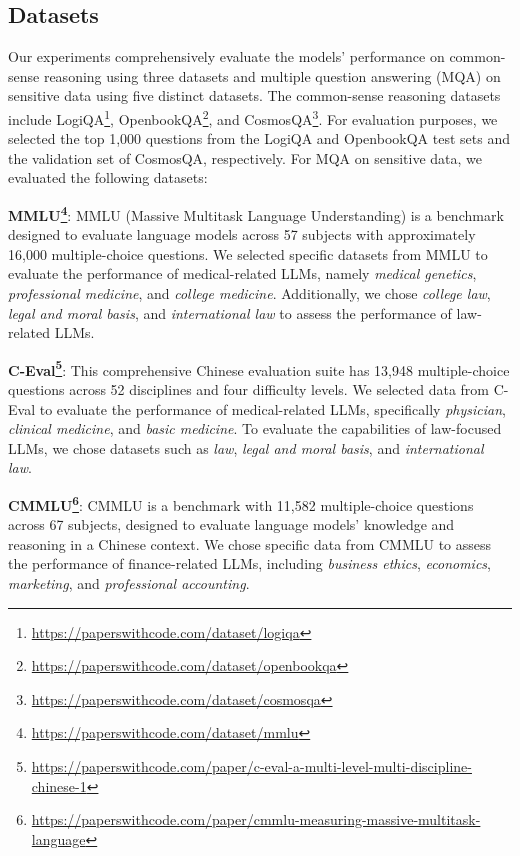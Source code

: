 \subsection{Datasets}
\label{sec:appendix_datasets}
Our experiments comprehensively evaluate the models' performance on common-sense reasoning using three datasets and multiple question answering (MQA) on sensitive data using five distinct datasets. The common-sense reasoning datasets include LogiQA\footnote{\url{https://paperswithcode.com/dataset/logiqa}}, OpenbookQA\footnote{\url{https://paperswithcode.com/dataset/openbookqa}}, and CosmosQA\footnote{\url{https://paperswithcode.com/dataset/cosmosqa}}. For evaluation purposes, we selected the top 1,000 questions from the LogiQA and OpenbookQA test sets and the validation set of CosmosQA, respectively. For MQA on sensitive data, we evaluated the following datasets:

\textbf{MMLU\footnote{\url{https://paperswithcode.com/dataset/mmlu}}}: MMLU (Massive Multitask Language Understanding) is a benchmark designed to evaluate language models across 57 subjects with approximately 16,000 multiple-choice questions.
We selected specific datasets from MMLU to evaluate the performance of medical-related LLMs, namely \textit{medical genetics}, \textit{professional medicine}, and \textit{college medicine}. Additionally, we chose \textit{college law}, \textit{legal and moral basis}, and \textit{international law} to assess the performance of law-related LLMs.

\textbf{C-Eval\footnote{\url{https://paperswithcode.com/paper/c-eval-a-multi-level-multi-discipline-chinese-1}}}:  This comprehensive Chinese evaluation suite has 13,948 multiple-choice questions across 52 disciplines and four difficulty levels.
We selected data from C-Eval to evaluate the performance of medical-related LLMs, specifically \textit{physician}, \textit{clinical medicine}, and \textit{basic medicine}. To evaluate the capabilities of law-focused LLMs, we chose datasets such as \textit{law}, \textit{legal and moral basis}, and \textit{international law}.

\textbf{CMMLU\footnote{\url{https://paperswithcode.com/paper/cmmlu-measuring-massive-multitask-language}}}: 
CMMLU is a benchmark with 11,582 multiple-choice questions across 67 subjects, designed to evaluate language models' knowledge and reasoning in a Chinese context.
We chose specific data from CMMLU to assess the performance of finance-related LLMs, including \textit{business ethics}, \textit{economics}, \textit{marketing}, and \textit{professional accounting}.

